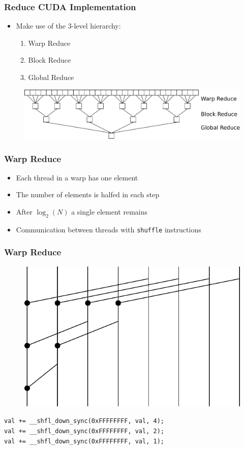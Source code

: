 \documentclass[aspectratio=169,handout]{beamer}
\begin{document}
\frame
{	
	\frametitle{Reduce CUDA Implementation}
	\begin{itemize}
		\item Make use of the 3-level hierarchy:
		\begin{enumerate}
			\item Warp Reduce
			\item Block Reduce
			\item Global Reduce
		\end{enumerate}	
	\end{itemize}
\begin{figure}
	\centering
	\includegraphics[height=0.3\textheight]{reduce}
\end{figure}
}


\frame
{	
	\frametitle{Warp Reduce}
	\begin{itemize}
		\item Each thread in a warp has one element
		\item The number of elements is halfed in each step
		\item After $\log_2(N)$ a single element remains
		\item Communication between threads with \texttt{shuffle} instructions
	\end{itemize}
}


\begin{frame}[fragile]
\frametitle{Warp Reduce}
\begin{figure}
	\includegraphics[height=0.5\textheight]{warpreduce}
\end{figure}
\begin{lstlisting}
val += __shfl_down_sync(0xFFFFFFFF, val, 4);
val += __shfl_down_sync(0xFFFFFFFF, val, 2);
val += __shfl_down_sync(0xFFFFFFFF, val, 1);
\end{lstlisting}

\end{frame}
\end{document}
